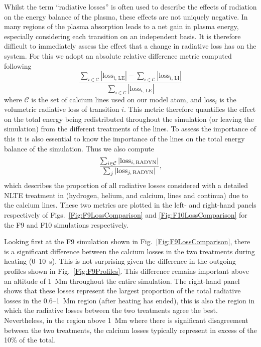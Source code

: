 Whilst the term ``radiative losses'' is often used to describe the effects of radiation on the energy balance of the plasma, these effects are not uniquely negative.
In many regions of the plasma absorption leads to a net gain in plasma energy, especially considering each transition on an independent basis.
It is therefore difficult to immediately assess the effect that a change in radiative loss has on the system.
For this we adopt an absolute relative difference metric computed following
\begin{equation}
    \frac{\sum_{i\in\mathcal{C}}|\mathrm{loss}_{i,\,\mathrm{LE}}| - \sum_{i\in\mathcal{C}}|\mathrm{loss}_{i,\,\mathrm{LI}}|}{\sum_{i\in\mathcal{C}}|\mathrm{loss}_{i,\,\mathrm{LE}}|}
\end{equation}
where $\mathcal{C}$ is the set of calcium lines used on our model atom, and $\mathrm{loss}_i$ is the volumetric radiative loss of transition $i$.
This metric therefore quantifies the effect on the total energy being redistributed throughout the simulation (or leaving the simulation) from the different treatments of the \Caii{} lines.
To assess the importance of this it is also essential to know the importance of the \Caii{} lines on the total energy balance of the simulation.
Thus we also compute
\begin{equation}
    \frac{\sum_{i\in\mathcal{C}}|\mathrm{loss}_{i,\,\mathrm{RADYN{}}}|}{\sum_j|\mathrm{loss}_{j,\,\mathrm{RADYN{}}}|},
\end{equation}
which describes the proportion of all radiative losses considered with a detailed NLTE treatment in \Radyn{} (hydrogen, helium, and calcium, lines and continua) due to the calcium lines.
These two metrics are plotted in the left- and right-hand panels respectively of Figs.~\ref{Fig:F9LossComparison} and \ref{Fig:F10LossComparison} for the F9 and F10 simulations respectively.

Looking first at the F9 simulation shown in Fig.~\ref{Fig:F9LossComparison}, there is a significant difference between the calcium losses in the two treatments during heating (0--\SI{10}{\second}).
This is not surprising given the difference in the outgoing profiles shown in Fig.~\ref{Fig:F9Profiles}.
This difference remains important above an altitude of \SI{1}{\mega\metre} throughout the entire simulation.
The right-hand panel shows that these losses represent the largest proportion of the total radiative losses in the 0.6--\SI{1}{\mega\metre} region (after heating has ended), this is also the region in which the radiative losses between the two treatments agree the best.
Nevertheless, in the region above \SI{1}{\mega\metre} where there is significant disagreement between the two treatments, the calcium losses typically represent in excess of the 10\% of the total.

